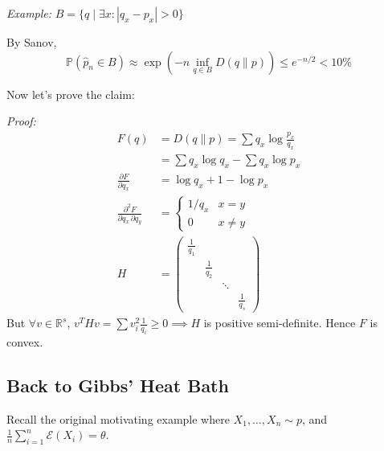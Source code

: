 \documentclass[12pt]{report}
\renewcommand{\hat}[1]{\widehat{#1}}
\renewcommand{\P}{\mathbb{P}}
\newcommand{\R}{\mathbb{R}}
\newcommand{\abs}[1]{\left\vert #1 \right\vert}
\newcommand{\Ec}{\mathcal{E}}
\newenvironment*{proof}[1][blue]{
\begin{tcolorbox}[
    parbox=false,
    colback=#1!5!white,
    colframe=#1!75!black,
    breakable
]}
{\end{tcolorbox}}
\begin{document}
\emph{Example:} $B = \{q \; | \; \exists x: \abs{q_x - p_x} > 0\}$

By Sanov,
\[\P(\hat p_n \in B) \approx \exp(-n \inf_{q\in B} D(q \parallel p)) \leq e^{-n/2} < 10\%\]

Now let's prove the claim:
\begin{proof}
	\emph{Proof:}
	\begin{align*}
		F(q)                                              & = D(q \parallel p) = \sum q_x \log \frac{p_x}{q_x} \\
		                                                  & = \sum q_x \log q_x - \sum q_x \log p_x            \\
		\frac{\partial F}{\partial q_x}                   & = \log q_x + 1 - \log p_x                          \\
		\frac{\partial^2 F}{\partial q_x \, \partial q_y} & = \begin{cases}
			                                                      1/q_x & x = y    \\
			                                                      0     & x \neq y
		                                                      \end{cases}                                 \\
		H                                                 & = \begin{pmatrix}
			                                                      \frac{1}{q_1}                             \\
			                                                       & \frac{1}{q_2}                          \\
			                                                       &               & \ddots                 \\
			                                                       &               &        & \frac{1}{q_s}
		                                                      \end{pmatrix}
	\end{align*}
	But $\forall v \in \R^s$, $v^T H v = \sum v_i^2 \frac{1}{q_i} \geq 0 \implies H$ is positive semi-definite. Hence $F$ is convex.
\end{proof}

\subsection{Back to Gibbs' Heat Bath}
Recall the original motivating example where $X_1, \dots, X_n \sim p$, and $\frac{1}{n} \sum_{i=1}^{n} \Ec(X_i) = \theta$.
\end{document}
